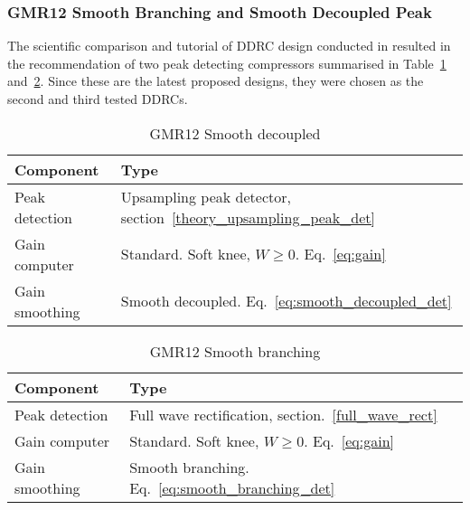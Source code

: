 \documentclass[../main2.tex]{subfiles}
\begin{document}
\subsubsection{GMR12 Smooth Branching and Smooth Decoupled Peak}
The scientific comparison and tutorial of DDRC design conducted in \cite{reiss2012tutorial} resulted in the recommendation of two peak detecting compressors summarised in Table~\ref{tab:gmr12_decoupled} and~\ref{tab:gmr12_branching}. Since these are the latest proposed designs, they were chosen as the second and third tested DDRCs.
\begin{table}[h]
\begin{center}
\caption{GMR12 Smooth decoupled}
\label{tab:gmr12_decoupled}
\begin{tabular}{| l | l |}
	\hline
	Component & Type \\ \hline
	Peak detection & Upsampling peak detector, section~\ref{theory_upsampling_peak_det} \\
	Gain computer & Standard. Soft knee, $W\geq0$. Eq.~\eqref{eq:gain} \\
	Gain smoothing & Smooth decoupled. Eq.~\eqref{eq:smooth_decoupled_det} \\
	\hline
\end{tabular}
\end{center}
\end{table}
\begin{table}[h]
\begin{center}
\caption{GMR12 Smooth branching}
\label{tab:gmr12_branching}
\begin{tabular}{| l | l |}
	\hline
	Component & Type \\ \hline
	Peak detection & Full wave rectification, section.~\ref{full_wave_rect} \\
	Gain computer & Standard. Soft knee, $W\geq0$. Eq.~\eqref{eq:gain} \\
	Gain smoothing & Smooth branching. Eq.~\eqref{eq:smooth_branching_det} \\
	\hline
\end{tabular}
\end{center}
\end{table}
\end{document}
